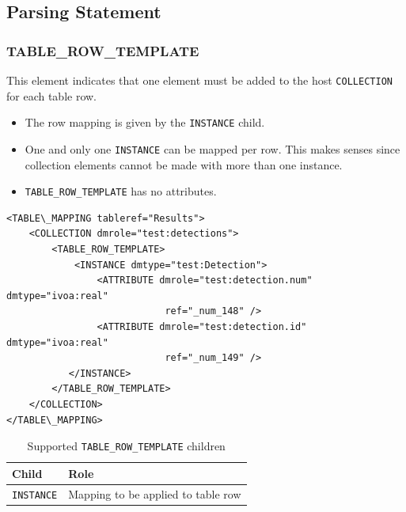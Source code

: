 \documentclass[11pt,a4paper]{ivoa}
\begin{document}
%
%
\subsection{Parsing Statement}

%
%

\subsubsection{TABLE\_ROW\_TEMPLATE}
This element indicates that one element must be added to the host \texttt{COLLECTION} for each table row.

\begin{itemize}
    \item The row mapping is given by the \texttt{INSTANCE} child.
    \item One and only one \texttt{INSTANCE} can be mapped per row. 
             This makes senses since collection elements cannot be made with more than one instance.
   \item \texttt{TABLE\_ROW\_TEMPLATE}  has no attributes.
\end{itemize}

\begin{lstlisting}[caption={TABLE\_ROW\_TEMPLATE examples},style=XML]
<TABLE\_MAPPING tableref="Results">
    <COLLECTION dmrole="test:detections">
        <TABLE_ROW_TEMPLATE>
            <INSTANCE dmtype="test:Detection">
                <ATTRIBUTE dmrole="test:detection.num" dmtype="ivoa:real"
                            ref="_num_148" />
                <ATTRIBUTE dmrole="test:detection.id" dmtype="ivoa:real"
                            ref="_num_149" />
           </INSTANCE>
        </TABLE_ROW_TEMPLATE>
    </COLLECTION>
</TABLE\_MAPPING>
\end{lstlisting}

\begin{table}[!htbp]
\small
\centering
\begin{tabulary}{\linewidth}{|L|J|}
       \hline  
          \textbf{Child} &  
          \textbf{Role}\\
       \hline  
          \texttt{INSTANCE}    & 
          Mapping to be applied to table row \\       
       \hline 
     \end{tabulary}
     \caption{Supported  \texttt{TABLE\_ROW\_TEMPLATE} children} 
     \label{trt:row-children}
\end{table}
\FloatBarrier
\end{document}
